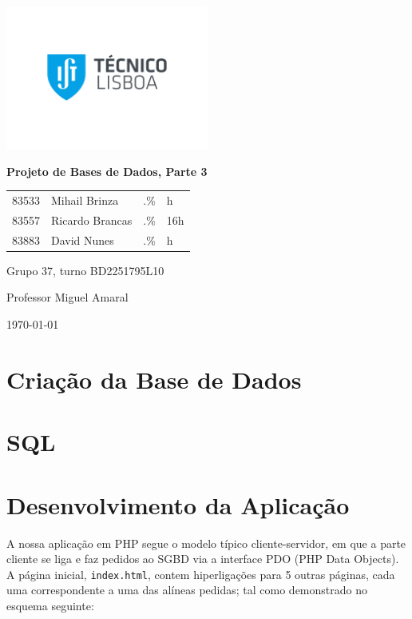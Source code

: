 \documentclass[a4paper]{article}
\begin{document}
    \begin{titlepage}
        \centering
        \includegraphics[width=0.5\textwidth]{IST_A_CMYK_POS.pdf}\par
        {\huge\bfseries Projeto de Bases de Dados, Parte 3\par}
        \vspace{2cm}
        {
        \Large
        \begin{tabular}{llll}
            83533 & Mihail Brinza & .\% & h \\
            83557 & Ricardo Brancas & .\% & 16h \\
            83883 & David Nunes & .\% & h
        \end{tabular}
        }
        \vfill
        \large
        Grupo 37, turno BD2251795L10 \par
        Professor Miguel Amaral

        \vspace{3cm}

        {\normalsize \today\par}
    \end{titlepage}

    \section{Criação da Base de Dados}
    

    \section{SQL}
    

    \section{Desenvolvimento da Aplicação}
    A nossa aplicação em PHP segue o modelo típico cliente-servidor, em que a parte cliente se liga e faz pedidos ao SGBD
    via a interface PDO (PHP Data Objects).
    A página inicial, \texttt{index.html}, contem hiperligações para 5 outras páginas, cada uma correspondente
    a uma das alíneas pedidas; tal como demonstrado no esquema seguinte:
\end{document}
